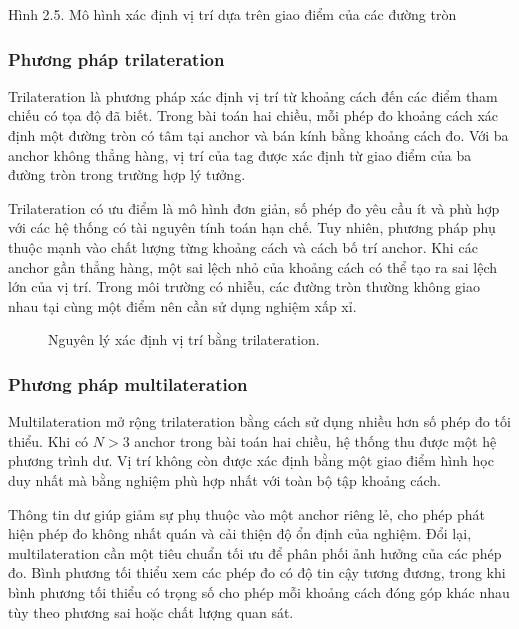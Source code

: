 \documentclass[
  a4paper,
]{report}
\begin{document}
Hình 2.5. Mô hình xác định vị trí dựa trên giao điểm của các đường tròn

\subsubsection{Phương pháp trilateration}

Trilateration là phương pháp xác định vị trí từ khoảng cách đến các điểm tham
chiếu có tọa độ đã biết. Trong bài toán hai chiều, mỗi phép đo khoảng cách xác
định một đường tròn có tâm tại anchor và bán kính bằng khoảng cách đo. Với ba
anchor không thẳng hàng, vị trí của tag được xác định từ giao điểm của ba
đường tròn trong trường hợp lý tưởng.

Trilateration có ưu điểm là mô hình đơn giản, số phép đo yêu cầu ít và phù hợp
với các hệ thống có tài nguyên tính toán hạn chế. Tuy nhiên, phương pháp phụ
thuộc mạnh vào chất lượng từng khoảng cách và cách bố trí anchor. Khi các
anchor gần thẳng hàng, một sai lệch nhỏ của khoảng cách có thể tạo ra sai lệch
lớn của vị trí. Trong môi trường có nhiễu, các đường tròn thường không giao
nhau tại cùng một điểm nên cần sử dụng nghiệm xấp xỉ.

\begin{figure}[H]
  \centering
  \caption{Nguyên lý xác định vị trí bằng trilateration.}
  \label{fig:trilateration-concept}
\end{figure}

\subsubsection{Phương pháp multilateration}

Multilateration mở rộng trilateration bằng cách sử dụng nhiều hơn số phép đo
tối thiểu. Khi có $N>3$ anchor trong bài toán hai chiều, hệ thống thu được một
hệ phương trình dư. Vị trí không còn được xác định bằng một giao điểm hình học
duy nhất mà bằng nghiệm phù hợp nhất với toàn bộ tập khoảng cách.

Thông tin dư giúp giảm sự phụ thuộc vào một anchor riêng lẻ, cho phép phát
hiện phép đo không nhất quán và cải thiện độ ổn định của nghiệm. Đổi lại,
multilateration cần một tiêu chuẩn tối ưu để phân phối ảnh hưởng của các phép
đo. Bình phương tối thiểu xem các phép đo có độ tin cậy tương đương, trong khi
bình phương tối thiểu có trọng số cho phép mỗi khoảng cách đóng góp khác nhau
tùy theo phương sai hoặc chất lượng quan sát.
\end{document}
